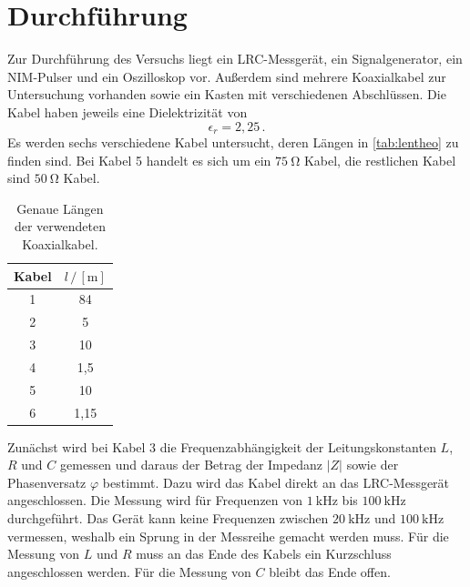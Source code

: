 %
%
\section{Durchführung}
\label{Durchführung}
Zur Durchführung des Versuchs liegt ein LRC-Messgerät, ein Signalgenerator, ein NIM-Pulser und ein Oszilloskop vor.
Außerdem sind mehrere Koaxialkabel zur Untersuchung vorhanden sowie ein Kasten mit verschiedenen Abschlüssen. 
Die Kabel haben jeweils eine Dielektrizität von~\cite{V52}
\begin{equation}
    \epsilon_{r} = 2,25 \, .
    \label{eqn:dieltheo}
\end{equation}
Es werden sechs verschiedene Kabel untersucht, deren Längen in \autoref{tab:lentheo} zu finden sind.
Bei Kabel 5 handelt es sich um ein $\qty{75}{\ohm}$ Kabel, die restlichen Kabel sind $\qty{50}{\ohm}$ Kabel.
\begin{table}[H]
    \centering
    \caption{Genaue Längen der verwendeten Koaxialkabel.}
    \begin{tabular}{cc}
    \toprule
    Kabel& $l \,/\, [\unit{\meter}]$ \\
    \midrule
    1  & 84 \\
    2  & 5\\
    3  & 10\\
    4  & 1,5\\
    5  & 10\\
    6  & 1,15\\
    \bottomrule
    \end{tabular}
    \label{tab:lentheo}
\end{table}
\FloatBarrier\noindent
Zunächst wird bei Kabel 3 die Frequenzabhängigkeit der Leitungskonstanten $L$, $R$ und $C$ gemessen und daraus der Betrag der Impedanz $\left|Z\right|$ sowie der Phasenversatz $\varphi$ bestimmt. 
Dazu wird das Kabel direkt an das LRC-Messgerät angeschlossen.
Die Messung wird für Frequenzen von $\qty{1}{\kilo\hertz}$ bis $\qty{100}{\kilo\hertz}$ durchgeführt.
Das Gerät kann keine Frequenzen zwischen $\qty{20}{\kilo\hertz}$ und $\qty{100}{\kilo\hertz}$ vermessen, weshalb ein Sprung in der Messreihe gemacht werden muss. 
Für die Messung von $L$ und $R$ muss an das Ende des Kabels ein Kurzschluss angeschlossen werden. Für die Messung von $C$ bleibt das Ende offen. 
\\\\
